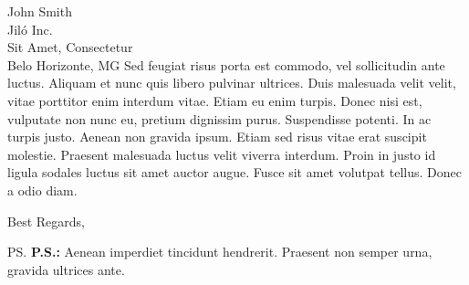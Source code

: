 \documentclass[a4paper,obeyspaces]{letter}
\begin{document}
\begin{letter}{John Smith\\ Jiló Inc.\\ Sit Amet, Consectetur \\ Belo Horizonte, MG}
Sed feugiat risus porta est commodo, vel sollicitudin ante luctus. Aliquam et 
nunc quis libero pulvinar ultrices. Duis malesuada velit velit, vitae porttitor 
enim interdum vitae. Etiam eu enim turpis. Donec nisi est, vulputate non nunc 
eu, pretium dignissim purus. Suspendisse potenti. In ac turpis justo. Aenean 
non gravida ipsum. Etiam sed risus vitae erat suscipit molestie. Praesent 
malesuada luctus velit viverra interdum. Proin in justo id ligula sodales 
luctus sit amet auctor augue. Fusce sit amet volutpat tellus. Donec a odio diam.


\vspace{2\parskip}
\closing{Best Regards,}

\vspace{2\parskip}
\ps{\textbf{P.S.:} Aenean imperdiet tincidunt hendrerit. Praesent non semper 
urna, gravida ultrices ante.}

\end{letter}
\end{document}
